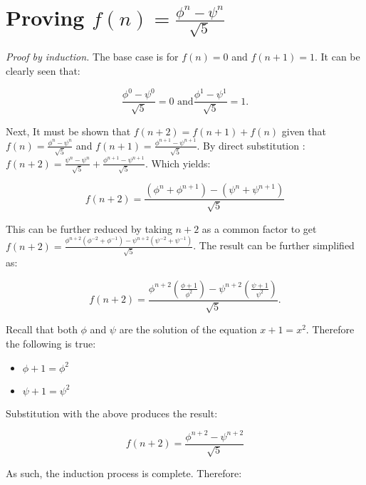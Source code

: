 \documentclass[13pt]{article}
\begin{document}
\section*{Proving \( f(n) = \frac{\phi ^{n} - \psi ^{n}}{\sqrt{5}
} \)}

\emph{Proof by induction.} The base case is for \( f(n) = 0 \) and \(
f(n+1) = 1 \).  It can be clearly seen that:

\begin{equation}
\frac{\phi ^{0} - \psi ^{0} }{\sqrt{5}} = 0 \text{ and
}\frac{\phi ^{1} - \psi ^{1}}{\sqrt{5}} = 1.
\end{equation}

Next, It must be shown that \( f(n+2) = f(n+1) + f(n) \) given
that \( f(n) = \frac{\phi ^{n} - \psi ^{n}}{\sqrt{5}} \) and \(
f(n+1) = \frac{\phi ^{n + 1} - \psi ^{n+1}}{\sqrt{5}} \).
By direct substitution : \( f(n+2) = \frac{\psi ^{n} - \psi
^{n}}{\sqrt{5}} + \frac{\phi ^{n+1} - \psi ^{n+1}  }{\sqrt{5}
} \). Which yields:

\begin{equation}
	f(n+2) = \frac{(\phi ^{n} + \phi ^{n+1} ) - (\psi ^{n} + \psi ^{n+1} )
	}{\sqrt{5}}
\end{equation}

This can be further reduced by taking \( n+2 \) as a common factor to
get \( f(n+2) = \frac{\phi ^{n+2} (\phi ^{-2} + \phi ^{-1}) - \psi ^{n+2} (\psi
^{-2}+ \psi ^{-1} )  }{\sqrt{5}}\). The result can be further simplified
as:

\begin{equation}
 f(n+2) = \frac{\phi ^{n+2} (\frac{\phi + 1}{\phi ^2}) - \psi ^{n+2}
(\frac{\psi + 1}{\psi ^2} )}{\sqrt{5}}.
\end{equation}

Recall that both \( \phi \) and \( \psi \) are the solution of the
equation \( x + 1 = x ^2 \). Therefore the following is true: 

\begin{itemize}
	\item \( \phi + 1 = \phi ^2 \) 
	\item \( \psi + 1 = \psi ^2 \)
\end{itemize}

Substitution with the above produces the result:

\begin{equation}
	f(n+2) = \frac{\phi ^{n+2} - \psi ^{n+2} }{\sqrt{5}} 
\end{equation}

As such, the induction process is complete. Therefore:
\end{document}
